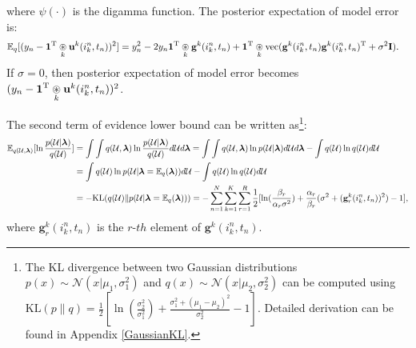 where $\psi(\cdot)$ is the digamma function.
The posterior expectation of model error is:
\begin{equation}
    \begin{split}
&\mathbb{E}_q[(y_n-\boldsymbol{1}^{\mathrm{T}}\underset{k}{\circledast} \mathbf{u}^k(i_k^n,t_n))^2]=y_n^2 -2y_n\boldsymbol{1}^{\mathrm{T}}\underset{k}{\circledast} \mathbf{g}^k(i_k^n,t_n) + \boldsymbol{1}^{\mathrm{T}}\underset{k}{\circledast} \text{vec}(\mathbf{g}^{k}(i_k^{n},t_n)\mathbf{g}^{k}(i_k^{n},t_n)^{\mathrm{T}}+\sigma^2\mathbf{I}).
    \end{split}
    \label{eq:model_err}
\end{equation}
If $\sigma=0$, then posterior expectation of model error becomes  $(y_n-\boldsymbol{1}^{\mathrm{T}}\underset{k}{\circledast} \mathbf{u}^k(i_k^n,t_n))^2$.

The second term of evidence lower bound can be written as\footnote{The KL divergence between two Gaussian distributions $p(x)\sim \mathcal{N}(x|\mu_1, \sigma_1^2)$ and $q(x)\sim \mathcal{N}(x|\mu_2, \sigma_2^2)$ can be computed using $\text{KL}(p\|q)=\frac{1}{2}[\ln(\frac{\sigma_2^2}{\sigma_1^2})+ \frac{\sigma_1^2+(\mu_1-\mu_2)^2}{\sigma_2^2}-1]$. Detailed derivation can be found in Appendix \ref{GaussianKL}. }:
\begin{equation}
    \begin{split}
    \mathbb{E}_{q(\mathcal{U}, \boldsymbol{\lambda})}[\ln 
    \frac{p(\mathcal{U}|\boldsymbol{\lambda})}{q(\mathcal{U})}]&= \int\int q(\mathcal{U}, \boldsymbol{\lambda})\ln 
    \frac{p(\mathcal{U}|\boldsymbol{\lambda})}{q(\mathcal{U})} d\mathcal{U}d\boldsymbol{\lambda} = \int\int q(\mathcal{U}, \boldsymbol{\lambda})\ln p(\mathcal{U}|\boldsymbol{\lambda})d\mathcal{U}d\boldsymbol{\lambda} - \int q(\mathcal{U})\ln q(\mathcal{U})d\mathcal{U}\\
    &=\int q(\mathcal{U})\ln p(\mathcal{U}|\boldsymbol{\lambda}=\mathbb{E}_q(\boldsymbol{\lambda}))d\mathcal{U} - \int q(\mathcal{U})\ln q(\mathcal{U})d\mathcal{U} \\
    &= -\text{KL}(q(\mathcal{U}) \| p(\mathcal{U}|\boldsymbol{\lambda}=\mathbb{E}_q(\boldsymbol{\lambda}))) = -\sum_{n=1}^N \sum_{k=1}^K\sum_{r=1}^R \frac{1}{2}[\ln(\frac{\beta_r}{\alpha_r\sigma^2})+ \frac{\alpha_r}{\beta_r}(\sigma^2+(\mathbf{g}^k_r(i_k^n, t_n))^2)-1],
    \end{split}
\end{equation}
where $\mathbf{g}^k_r(i_k^n, t_n)$ is the $r$-$th$ element of $\mathbf{g}^k(i_k^n, t_n)$.

